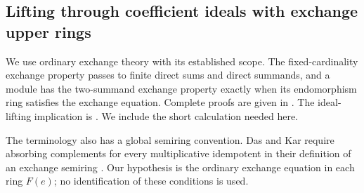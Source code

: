 \subsection{Lifting through coefficient ideals with exchange upper rings}
We use ordinary exchange theory with its established scope.
The fixed-cardinality exchange property passes to finite direct
sums and direct summands, and a module has the two-summand
exchange property exactly when its endomorphism ring satisfies
the exchange equation. Complete proofs are given in
\cite[Lemmas~2.3--2.4, Proposition~2.7 and Corollary~2.8,
pp.~2--6]{NielsenExchange}. The ideal-lifting implication is
\cite[Proposition~1.1 and Corollary~1.3, p.~270]{NicholsonExchange}.
We include the short calculation needed here.

The terminology also has a global semiring convention.
Das and Kar require absorbing complements for every
multiplicative idempotent in their definition of an exchange
semiring \cite[Section~2 and Definition~3.11, pp.~4 and~10]{DasKarExchange}.
Our hypothesis is the ordinary exchange equation in each
ring $F(e)$; no identification of these conditions is used.

